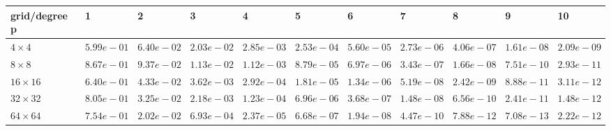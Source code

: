 \begin{tabular}{lllllllllll}
\hline
 grid/degree p   & 1          & 2          & 3          & 4          & 5          & 6          & 7          & 8          & 9          & 10         \\
\hline
 $4 \times 4$    & $5.99e-01$ & $6.40e-02$ & $2.03e-02$ & $2.85e-03$ & $2.53e-04$ & $5.60e-05$ & $2.73e-06$ & $4.06e-07$ & $1.61e-08$ & $2.09e-09$ \\
 $8 \times 8$    & $8.67e-01$ & $9.37e-02$ & $1.13e-02$ & $1.12e-03$ & $8.79e-05$ & $6.97e-06$ & $3.43e-07$ & $1.66e-08$ & $7.51e-10$ & $2.93e-11$ \\
 $16 \times 16$  & $6.40e-01$ & $4.33e-02$ & $3.62e-03$ & $2.92e-04$ & $1.81e-05$ & $1.34e-06$ & $5.19e-08$ & $2.42e-09$ & $8.88e-11$ & $3.11e-12$ \\
 $32 \times 32$  & $8.05e-01$ & $3.25e-02$ & $2.18e-03$ & $1.23e-04$ & $6.96e-06$ & $3.68e-07$ & $1.48e-08$ & $6.56e-10$ & $2.41e-11$ & $1.48e-12$ \\
 $64 \times 64$  & $7.54e-01$ & $2.02e-02$ & $6.93e-04$ & $2.37e-05$ & $6.68e-07$ & $1.94e-08$ & $4.47e-10$ & $7.88e-12$ & $7.08e-13$ & $2.22e-12$ \\
\hline
\end{tabular}